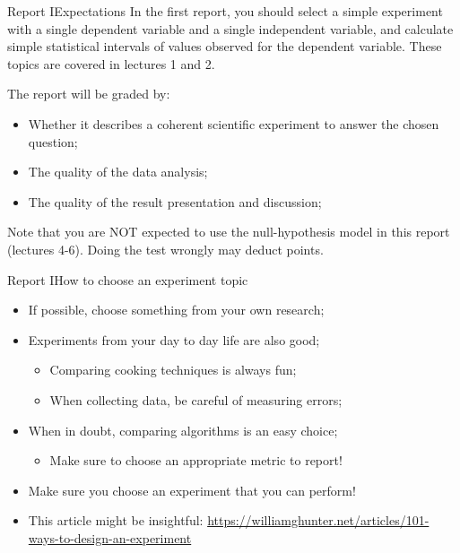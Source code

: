 \documentclass[aspectratio=169]{beamer}
\begin{document}
\begin{frame}{Report I}{Expectations}
  In the first report, you should select a simple experiment with a single dependent variable and a single independent variable, and calculate simple statistical intervals of values observed for the dependent variable. These topics are covered in lectures 1 and 2.\smallskip

  The report will be graded by:
  \begin{itemize}
    \item Whether it describes a coherent scientific experiment to answer the chosen question;
    \item The quality of the data analysis;
    \item The quality of the result presentation and discussion;
  \end{itemize}\bigskip

\alert{Note that you are NOT expected to use the null-hypothesis model in this report (lectures 4-6). Doing the test wrongly may deduct points.}
\end{frame}



\begin{frame}{Report I}{How to choose an experiment topic}
  \begin{itemize}
    \item If possible, choose something from your own research;
    \medskip

    \item Experiments from your day to day life are also good;
    \begin{itemize}
      \item Comparing cooking techniques is always fun;
      \item When collecting data, be careful of measuring errors;
    \end{itemize}
    \medskip

    \item When in doubt, comparing algorithms is an easy choice;
    \begin{itemize}
      \item Make sure to choose an appropriate metric to report!
    \end{itemize}
    \medskip

    \item Make sure you choose an experiment that you can perform!
    \bigskip

    \item This article might be insightful: \url{https://williamghunter.net/articles/101-ways-to-design-an-experiment}
  \end{itemize}
\end{frame}
\end{document}

